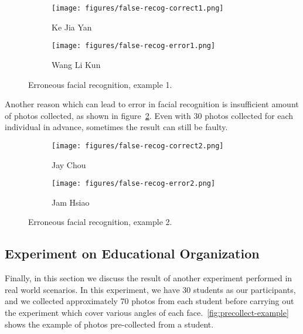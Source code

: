 \begin{figure}[!htb]
  \centering
  \begin{subfigure}[b]{0.3\linewidth}
    \texttt{[image: figures/false-recog-correct1.png]}
    \caption{Ke Jia Yan}
  \end{subfigure}
  \begin{subfigure}[b]{0.3\linewidth}
    \texttt{[image: figures/false-recog-error1.png]}
    \caption{Wang Li Kun}
  \end{subfigure}
  \caption{Erroneous facial recognition, example 1.}
  \label{fig:false-recog1}
\end{figure}

Another reason which can lead to error in facial recognition is insufficient amount of photos collected,
as shown in figure~\ref{fig:false-recog2}. Even with 30 photos collected for each individual in advance,
sometimes the result can still be faulty.%
\vspace{0.2cm}

\begin{figure}[!htb]
  \centering
  \begin{subfigure}[b]{0.3\linewidth}
    \texttt{[image: figures/false-recog-correct2.png]}
    \caption{Jay Chou}
  \end{subfigure}
  \begin{subfigure}[b]{0.3\linewidth}
    \texttt{[image: figures/false-recog-error2.png]}
    \caption{Jam Hsiao}
  \end{subfigure}
  \caption{Erroneous facial recognition, example 2.}
  \label{fig:false-recog2}
\end{figure}
\vspace{0.2cm}



\subsection{Experiment on Educational Organization}
Finally, in this section we discuss the result of another experiment performed
in real world scenarios. In this experiment, we have 30 students as our participants,
and we collected approximately 70 photos from each student before carrying out the experiment
which cover various angles of each face.~\ref{fig:precollect-example} shows the example of photos
pre-collected from a student.

